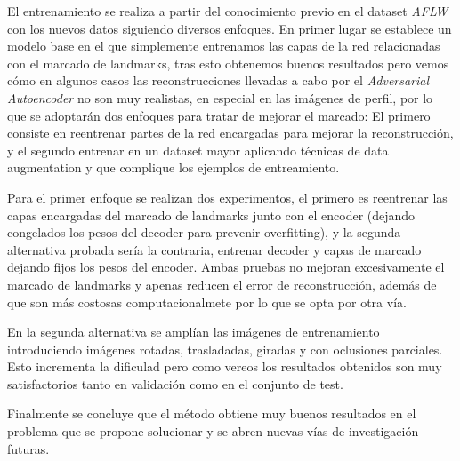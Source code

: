 \medskip

\noindent El entrenamiento se realiza a partir del conocimiento previo en el dataset \textit{AFLW} con los nuevos datos siguiendo diversos enfoques. En primer lugar se establece un modelo base en el que simplemente entrenamos las capas de la red relacionadas con el marcado de landmarks, tras esto obtenemos buenos resultados pero vemos cómo en algunos casos las reconstrucciones llevadas a cabo por el \textit{Adversarial Autoencoder} no son muy realistas, en especial en las imágenes de perfil, por lo que se adoptarán dos enfoques para tratar de mejorar el marcado: El primero consiste en reentrenar partes de la red encargadas para mejorar la reconstrucción, y el segundo entrenar en un dataset mayor aplicando técnicas de data augmentation y que complique los ejemplos de entreamiento. 


\medskip 

\noindent Para el primer enfoque se realizan dos experimentos, el primero es reentrenar las capas encargadas del marcado de landmarks junto con el encoder (dejando congelados los pesos del decoder para prevenir overfitting), y la segunda alternativa probada sería la contraria, entrenar decoder y capas de marcado dejando fijos los pesos del encoder. Ambas pruebas no mejoran excesivamente el marcado de landmarks y apenas reducen el error de reconstrucción, además de que son más costosas computacionalmete por lo que se opta por otra vía. 

\medskip

\noindent En la segunda alternativa se amplían las imágenes de entrenamiento introduciendo imágenes rotadas, trasladadas, giradas y con oclusiones parciales. Esto incrementa la dificulad pero como vereos los resultados obtenidos son muy satisfactorios tanto en validación como en el conjunto de test.

\noindent Finalmente se concluye que el método obtiene muy buenos resultados en el problema que se propone solucionar y se abren nuevas vías de investigación futuras.

\endinput
